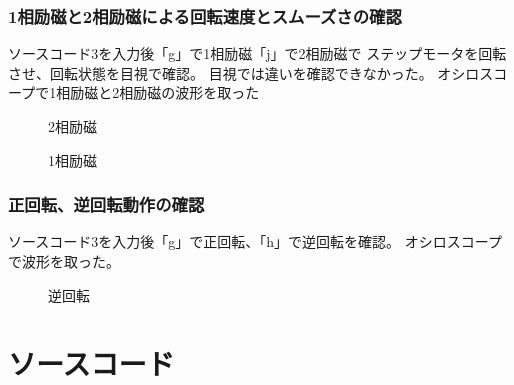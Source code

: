 \documentclass[10pt,a4paper]{jarticle}
\begin{document}
\subsubsection{1相励磁と2相励磁による回転速度とスムーズさの確認}
ソースコード3を入力後「g」で1相励磁「j」で2相励磁で
ステップモータを回転させ、回転状態を目視で確認。
目視では違いを確認できなかった。
オシロスコープで1相励磁と2相励磁の波形を取った
\begin{figure}[hbtp]
 \begin{minipage}{0.5\hsize}
 \begin{center}
 \caption{2相励磁}
 \label{fig:2rei}
 \end{center}
 \end{minipage}
 \begin{minipage}{0.5\hsize}
 \begin{center}
 \caption{1相励磁}
 \label{fig:1rei}
 \end{center}
 \end{minipage}
\end{figure}
\subsubsection{正回転、逆回転動作の確認}
ソースコード3を入力後「g」で正回転、「h」で逆回転を確認。
オシロスコープで波形を取った。
\begin{figure}[hbtp]
 \begin{center}
 \caption{逆回転}
 \label{fig:gyaku}
 \end{center}
\end{figure}
\section{ソースコード}
\end{document}

